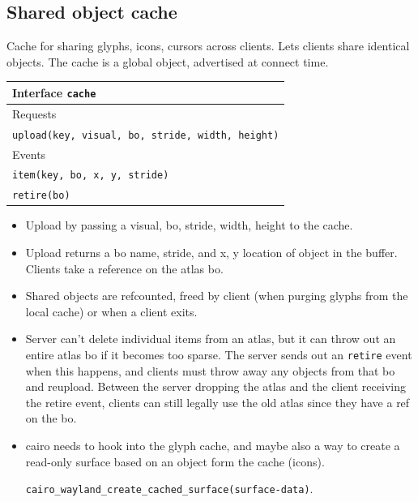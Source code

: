 \documentclass{article}
\begin{document}
\subsection{Shared object cache}

Cache for sharing glyphs, icons, cursors across clients.  Lets clients
share identical objects.  The cache is a global object, advertised at
connect time.

\begin{tabular}{l}
  \hline 
  Interface \texttt{cache} \\ \hline 
  Requests \\ \hline 
  \texttt{upload(key, visual, bo, stride, width, height)} \\ \hline
  Events \\ \hline
  \texttt{item(key, bo, x, y, stride)} \\ 
  \texttt{retire(bo)} \\ \hline
\end{tabular}

\begin{itemize}

\item Upload by passing a visual, bo, stride, width, height to the
  cache.

\item Upload returns a bo name, stride, and x, y location of object in
  the buffer.  Clients take a reference on the atlas bo.

\item Shared objects are refcounted, freed by client (when purging
  glyphs from the local cache) or when a client exits.

\item Server can't delete individual items from an atlas, but it can
  throw out an entire atlas bo if it becomes too sparse.  The server
  sends out an \texttt{retire} event when this happens, and clients
  must throw away any objects from that bo and reupload.  Between the
  server dropping the atlas and the client receiving the retire event,
  clients can still legally use the old atlas since they have a ref on
  the bo.

\item cairo needs to hook into the glyph cache, and maybe also a way
  to create a read-only surface based on an object form the cache
  (icons). 

  \texttt{cairo\_wayland\_create\_cached\_surface(surface-data)}.

\end{itemize}
\end{document}
